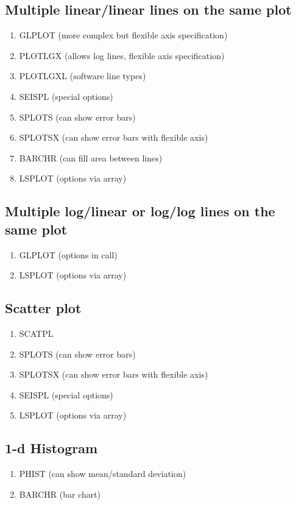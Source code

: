 \documentclass[11pt]{report}
\begin{document}
\subsection{Multiple linear/linear lines on the same plot}
\begin{enumerate}
\item  GLPLOT   (more complex but flexible axis specification)
\item  PLOTLGX  (allows log lines, flexible axis specification)
\item  PLOTLGXL (software line types)
\item  SEISPL   (special options)
\item  SPLOTS   (can show error bars)
\item  SPLOTSX  (can show error bars with flexible axis)
\item  BARCHR   (can fill area between lines)
\item  LSPLOT (options via array)
\end{enumerate}

\subsection{Multiple log/linear or log/log lines on the same plot}
\begin{enumerate}
\item  GLPLOT (options in call)
\item  LSPLOT (options via array)
\end{enumerate}

\subsection{Scatter plot}
\begin{enumerate}
\item  SCATPL
\item  SPLOTS  (can show error bars)
\item  SPLOTSX (can show error bars with flexible axis)
\item  SEISPL  (special options)
\item  LSPLOT (options via array)
\end{enumerate}

\subsection{1-d Histogram}
\begin{enumerate}
\item  PHIST  (can show mean/standard deviation)
\item  BARCHR (bar chart)
\end{enumerate}
\end{document}
